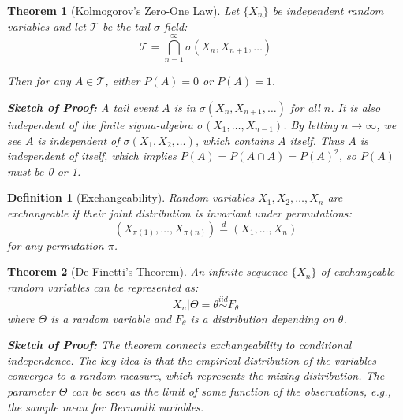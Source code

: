 \documentclass[12pt,a4paper]{article}
\newtheorem{theorem}{Theorem}[section]
\newtheorem{definition}{Definition}[section]
\theoremstyle{remark}
\begin{document}
\begin{theorem}[Kolmogorov's Zero-One Law]
Let $\{X_n\}$ be independent random variables and let $\mathcal{T}$ be the tail $\sigma$-field:
$$\mathcal{T} = \bigcap_{n=1}^{\infty} \sigma(X_n, X_{n+1}, \ldots)$$

Then for any $A \in \mathcal{T}$, either $P(A) = 0$ or $P(A) = 1$.

\textbf{Sketch of Proof:} A tail event $A$ is in $\sigma(X_n, X_{n+1}, \ldots)$ for all $n$. It is also independent of the finite sigma-algebra $\sigma(X_1, \ldots, X_{n-1})$. By letting $n\to\infty$, we see $A$ is independent of $\sigma(X_1, X_2, \ldots)$, which contains $A$ itself. Thus $A$ is independent of itself, which implies $P(A) = P(A \cap A) = P(A)^2$, so $P(A)$ must be 0 or 1.
\end{theorem}

\begin{definition}[Exchangeability]
Random variables $X_1, X_2, \ldots, X_n$ are exchangeable if their joint distribution is invariant under permutations:
$$(X_{\pi(1)}, \ldots, X_{\pi(n)}) \stackrel{d}{=} (X_1, \ldots, X_n)$$
for any permutation $\pi$.
\end{definition}

\begin{theorem}[De Finetti's Theorem]
An infinite sequence $\{X_n\}$ of exchangeable random variables can be represented as:
$$X_n | \Theta = \theta \stackrel{iid}{\sim} F_\theta$$
where $\Theta$ is a random variable and $F_\theta$ is a distribution depending on $\theta$.

\textbf{Sketch of Proof:} The theorem connects exchangeability to conditional independence. The key idea is that the empirical distribution of the variables converges to a random measure, which represents the mixing distribution. The parameter $\Theta$ can be seen as the limit of some function of the observations, e.g., the sample mean for Bernoulli variables.
\end{theorem}
\end{document}
